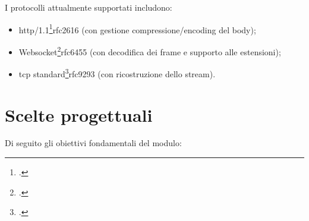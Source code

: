 I protocolli attualmente supportati includono:
\begin{itemize}
    \setlength{\itemsep}{4pt}
    \setlength{\parskip}{4pt}
    \item \gls{http}/1.1\footcite{RFC2616, Hypertext Transfer Protocol -- HTTP/1.1}{rfc2616} (con gestione compressione/encoding del body);
    \item Websocket\footcite{RFC6455, The WebSocket Protocol}{rfc6455} (con decodifica dei frame e supporto alle estensioni);
    \item \gls{tcp} standard\footcite{RFC9293, Transmission Control Protocol (TCP)}{rfc9293} (con ricostruzione dello stream).
\end{itemize}

\section{Scelte progettuali}

Di seguito gli obiettivi fondamentali del modulo:

